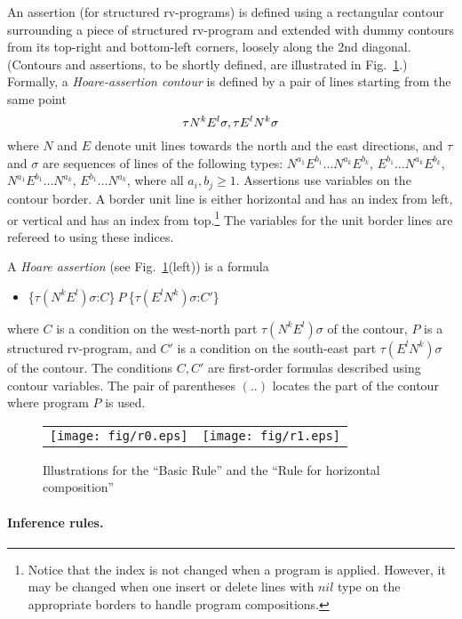 \documentclass[runningheads]{llncs}
\newcommand{\1}{\u{a}}
\newcommand{\2}{\c{s}}
\newcommand{\5}{\c{t}}
\newcommand{\8}{\^{\i}}
\newcommand{\9}{\^{a}}
\newcommand{\snvsp}{\vspace{-1ex}}
\newcommand{\bi}{\begin{itemize}}
\newcommand{\ei}{\end{itemize}}
\newcommand{\foo}[1]{\footnote{#1}}
\newcommand{\hass}[3]{\{$ #1 $\}{$\ #2\ $}\{$ #3 $\}}
\begin{document}
An assertion (for structured rv-programs) is defined using a rectangular contour surrounding a piece of
structured rv-program and extended with dummy contours from its top-right and bottom-left corners, loosely
along the 2nd diagonal. (Contours and assertions, to be shortly defined, are illustrated in Fig.~\ref{ro-r1}.)
Formally, a {\em Hoare-assertion contour} is defined by a pair of lines starting from the same point
\snvsp$$\tau N^kE^l\sigma, \tau E^lN^k\sigma\snvsp$$ where $N$ and $E$ denote unit lines towards the north and
the east directions, and $\tau$ and $\sigma$ are sequences of lines of the following types:
$N^{a_1}E^{b_1}\dots N^{a_k}E^{b_k}$, $E^{b_1}\dots N^{a_k}E^{b_k}$, $N^{a_1}E^{b_1}\dots N^{a_k}$,
$E^{b_1}\dots N^{a_k}$, where all $a_i,b_j\geq 1$. Assertions use variables on the contour border. A border
unit line is either horizontal and has an index from left, or vertical and has an index from top.\foo{Notice
  that the index is not changed when a program is applied. However, it may be changed when one insert or
  delete lines with $nil$ type on the appropriate borders to handle program compositions.}  The variables for
the unit border lines are refereed to using these indices.

A {\em Hoare assertion} (see Fig.~\ref{ro-r1}(left)) is a formula \snvsp\bi\item[]\hspace*{1cm}\hass{\tau
  (N^kE^l)\sigma\mbox{:} C}{P}{\tau (E^lN^k)\sigma\mbox{:} C'}\snvsp\ei where $C$ is a condition on the
west-north part $\tau (N^kE^l)\sigma$ of the contour, $P$ is a structured rv-program, and $C'$ is a condition
on the south-east part $\tau (E^lN^k)\sigma$ of the contour. The conditions $C,C'$ are first-order formulas
described using contour variables. The pair of parentheses $(..)$ locates the part of the contour where
program $P$ is used.

\begin{figure}\begin{center}\begin{tabular}{cc}
\texttt{[image: fig/r0.eps]} & \hspace*{-.5cm}\texttt{[image: fig/r1.eps]}
\end{tabular}\end{center}
\caption{Illustrations for the ``Basic Rule'' and the ``Rule for horizontal composition''}
\label{ro-r1}\end{figure}

\paragraph{Inference rules.}
\end{document}
